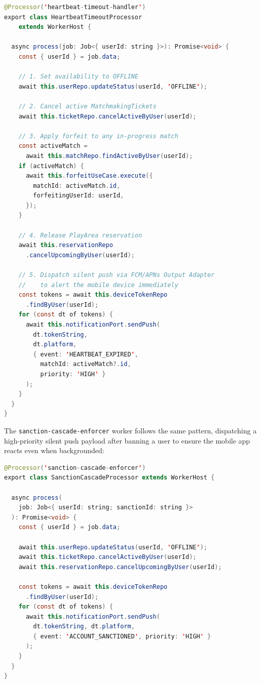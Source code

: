 \documentclass[11pt,a4paper]{report}
\begin{document}
\begin{lstlisting}[language=Java, caption={BullMQ heartbeat timeout processor}]
@Processor('heartbeat-timeout-handler')
export class HeartbeatTimeoutProcessor
    extends WorkerHost {

  async process(job: Job<{ userId: string }>): Promise<void> {
    const { userId } = job.data;

    // 1. Set availability to OFFLINE
    await this.userRepo.updateStatus(userId, 'OFFLINE');

    // 2. Cancel active MatchmakingTickets
    await this.ticketRepo.cancelActiveByUser(userId);

    // 3. Apply forfeit to any in-progress match
    const activeMatch =
      await this.matchRepo.findActiveByUser(userId);
    if (activeMatch) {
      await this.forfeitUseCase.execute({
        matchId: activeMatch.id,
        forfeitingUserId: userId,
      });
    }

    // 4. Release PlayArea reservation
    await this.reservationRepo
      .cancelUpcomingByUser(userId);

    // 5. Dispatch silent push via FCM/APNs Output Adapter
    //    to alert the mobile device immediately
    const tokens = await this.deviceTokenRepo
      .findByUser(userId);
    for (const dt of tokens) {
      await this.notificationPort.sendPush(
        dt.tokenString,
        dt.platform,
        { event: 'HEARTBEAT_EXPIRED',
          matchId: activeMatch?.id,
          priority: 'HIGH' }
      );
    }
  }
}
\end{lstlisting}

The \texttt{sanction-cascade-enforcer} worker follows the same pattern, dispatching a high-priority silent push payload after banning a user to ensure the mobile app reacts even when backgrounded:

\begin{lstlisting}[language=Java, caption={Sanction cascade worker with push dispatch}]
@Processor('sanction-cascade-enforcer')
export class SanctionCascadeProcessor extends WorkerHost {

  async process(
    job: Job<{ userId: string; sanctionId: string }>
  ): Promise<void> {
    const { userId } = job.data;

    await this.userRepo.updateStatus(userId, 'OFFLINE');
    await this.ticketRepo.cancelActiveByUser(userId);
    await this.reservationRepo.cancelUpcomingByUser(userId);

    const tokens = await this.deviceTokenRepo
      .findByUser(userId);
    for (const dt of tokens) {
      await this.notificationPort.sendPush(
        dt.tokenString, dt.platform,
        { event: 'ACCOUNT_SANCTIONED', priority: 'HIGH' }
      );
    }
  }
}
\end{lstlisting}
\end{document}
